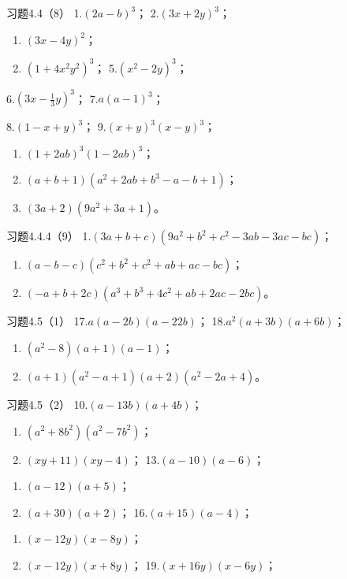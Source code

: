 习题4.4（8） 1.\((2a - b)^{3}\)； 2.\((3x + 2y)^{3}\)；
\begin{enumerate}[start=3]
\item
  \((3x - 4y)^{2}\)；
\item
  \((1 + 4x^{2}y^{2})^{3}\)； 5.\((x^{2} - 2y)^{3}\)；
\end{enumerate}
6.\(\left(3x - \frac{1}{3} y\right)^{3}\)； 7.\(a(a - 1)^{3}\)；

8.\((1 - x + y)^{3}\)； 9.\((x + y)^{3}(x - y)^{3}\)；
\begin{enumerate}[start=10]
\item
  \((1 + 2ab)^{3}(1 - 2ab)^{3}\)；
\item
  \((a + b + 1)(a^2 + 2ab + b^3 - a - b + 1)\)；
\item
  \((3a + 2)(9a^2 + 3a + 1)\)。
\end{enumerate}

习题4.4.4（9） 1.\((3a + b + c)(9a^2 + b^2 + c^2 - 3ab - 3ac - bc)\)；

\begin{enumerate}[start=2]
\item
  \((a - b - c)(c^2 + b^2 + c^2 + ab + ac - bc)\)；
\item
  \((-a + b + 2c)(a^3 + b^3 + 4c^2 + ab + 2ac - 2bc)\)。
\end{enumerate}

习题4.5（1） 17.\(a(a - 2b)(a - 22b)\)； 18.\(a^2 (a + 3b)(a + 6b)\)；

\begin{enumerate}[start=19]
\item
  \((a^2 - 8)(a + 1)(a - 1)\)；
\item
  \((a + 1)(a^2 - a + 1)(a + 2)(a^2 - 2a + 4)\)。
\end{enumerate}

习题4.5（2） 10.\((a - 13b)(a + 4b)\)；
\begin{enumerate}[start=11]
\item
  \((a^2 + 8b^2)(a^2 - 7b^2)\)；
\item
  \((xy + 11)(xy - 4)\)； 13.\((a - 10)(a - 6)\)；
\end{enumerate}
\begin{enumerate}[start=14]
\item
  \((a - 12)(a + 5)\)；
\item
  \((a + 30)(a + 2)\)； 16.\((a + 15)(a - 4)\)；
\end{enumerate}
\begin{enumerate}[start=17]
\item
  \((x - 12y)(x - 8y)\)；
\item
  \((x - 12y)(x + 8y)\)； 19.\((x + 16y)(x - 6y)\)；
\end{enumerate}

